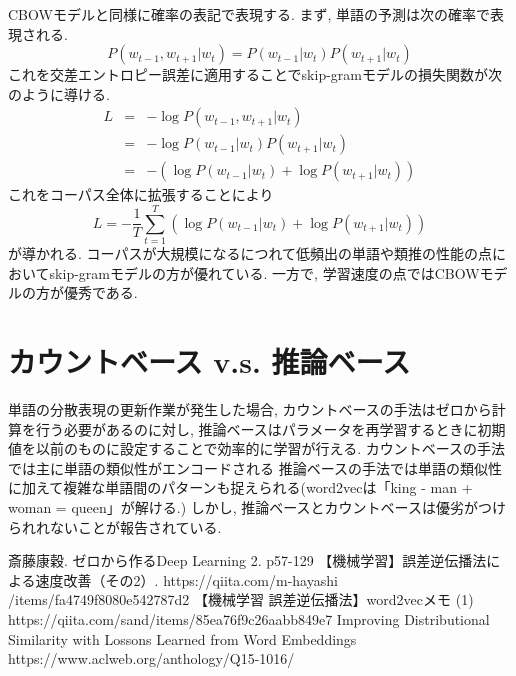\documentclass[twocolumn]{jarticle}
\begin{document}
CBOWモデルと同様に確率の表記で表現する. まず, 単語の予測は次の確率で表現される.
\begin{equation}
  P(w_{t-1}, w_{t+1}|w_t) = P(w_{t-1}|w_t)P(w_{t+1}|w_t)
\end{equation}
これを交差エントロピー誤差に適用することでskip-gramモデルの損失関数が次のように導ける.
\begin{eqnarray}
  L &=& - \log P(w_{t-1}, w_{t+1}|w_t) \nonumber \\
    &=& - \log P(w_{t-1}|w_t)P(w_{t+1}|w_t) \nonumber \\
    &=& - (\log P(w_{t-1}|w_t) + \log P(w_{t+1}|w_t))
\end{eqnarray}
これをコーパス全体に拡張することにより
\begin{equation}
  L = - \frac{1}{T} \sum^{T}_{t=1} (\log P(w_{t-1}|w_t) + \log P(w_{t+1}|w_t))
\end{equation}
が導かれる.
コーパスが大規模になるにつれて低頻出の単語や類推の性能の点においてskip-gramモデルの方が優れている. 一方で, 学習速度の点ではCBOWモデルの方が優秀である.

\section{カウントベース v.s. 推論ベース}
単語の分散表現の更新作業が発生した場合, カウントベースの手法はゼロから計算を行う必要があるのに対し, 推論ベースはパラメータを再学習するときに初期値を以前のものに設定することで効率的に学習が行える.
カウントベースの手法では主に単語の類似性がエンコードされる
推論ベースの手法では単語の類似性に加えて複雑な単語間のパターンも捉えられる(word2vecは「king - man + woman = queen」が解ける.)
しかし, 推論ベースとカウントベースは優劣がつけられれないことが報告されている.


\begin{thebibliography}{9}
   斎藤康穀. ゼロから作るDeep Learning 2. p57-129
   【機械学習】誤差逆伝播法による速度改善（その2）. https://qiita.com/m-hayashi\\/items/fa4749f8080e542787d2
   【機械学習 誤差逆伝播法】word2vecメモ (1) https://qiita.com/sand/items/85ea76f9c26aabb849e7
   Improving Distributional Similarity with Lossons Learned from Word Embeddings https://www.aclweb.org/anthology/Q15-1016/
\end{thebibliography}
\end{document}
